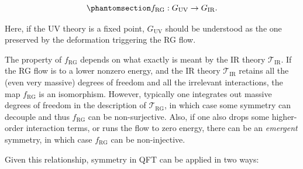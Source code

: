 \documentclass[
  letterpaper,
  DIV=11,
  numbers=noendperiod]{scrreport}
\begin{document}
\begin{tcolorbox}[enhanced jigsaw, opacityback=0, opacitybacktitle=0.6, leftrule=.75mm, arc=.35mm, coltitle=black, breakable, colframe=quarto-callout-important-color-frame, titlerule=0mm, colback=white, bottomrule=.15mm, left=2mm, colbacktitle=quarto-callout-important-color!10!white, toptitle=1mm, bottomtitle=1mm, title=\textcolor{quarto-callout-important-color}{\faExclamation}\hspace{0.5em}{RG flow homomorphism from UV symmetry to IR symmetry}, rightrule=.15mm, toprule=.15mm]

\begin{equation}\phantomsection\label{eq-RG-group-match}{
f_\text{RG} : G_\text{UV} \to G_\text{IR}.
}\end{equation}

\end{tcolorbox}

Here, if the UV theory is a fixed point, \(G_\text{UV}\) should be
understood as the one preserved by the deformation triggering the RG
flow.

\begin{tcolorbox}[enhanced jigsaw, opacityback=0, opacitybacktitle=0.6, leftrule=.75mm, arc=.35mm, coltitle=black, breakable, colframe=quarto-callout-note-color-frame, titlerule=0mm, colback=white, bottomrule=.15mm, left=2mm, colbacktitle=quarto-callout-note-color!10!white, toptitle=1mm, bottomtitle=1mm, title=\textcolor{quarto-callout-note-color}{\faInfo}\hspace{0.5em}{Property of \(f_\text{RG}\)}, rightrule=.15mm, toprule=.15mm]

The property of \(f_\text{RG}\) depends on what exactly is meant by the
IR theory \(\mathcal{T}_\text{IR}\). If the RG flow is to a lower
nonzero energy, and the IR theory \(\mathcal{T}_\text{IR}\) retains all
the (even very massive) degrees of freedom and all the irrelevant
interactions, the map \(f_\text{RG}\) is an isomorphism. However,
typically one integrates out massive degrees of freedom in the
description of \(\mathcal{T}_\text{RG}\), in which case some symmetry
can decouple and thus \(f_\text{RG}\) can be non-surjective. Also, if
one also drops some higher-order interaction terms, or runs the flow to
zero energy, there can be an \emph{emergent} symmetry, in which case
\(f_\text{RG}\) can be non-injective.

\end{tcolorbox}

Given this relationship, symmetry in QFT can be applied in two ways:
\end{document}
